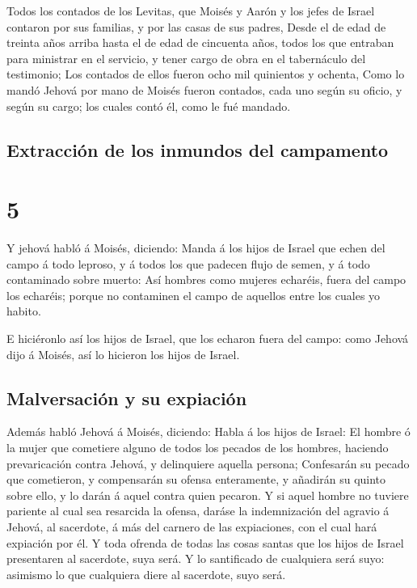  Todos los contados de los Levitas, que Moisés y Aarón y
los jefes de Israel contaron por sus familias, y por las casas de sus
padres,  Desde el de edad de treinta años arriba hasta el
de edad de cincuenta años, todos los que entraban para ministrar en el
servicio, y tener cargo de obra en el tabernáculo del testimonio;
 Los contados de ellos fueron ocho mil quinientos y
ochenta,  Como lo mandó Jehová por mano de Moisés fueron
contados, cada uno según su oficio, y según su cargo; los cuales contó
él, como le fué mandado.

\hypertarget{extracciuxf3n-de-los-inmundos-del-campamento}{%
\subsection{Extracción de los inmundos del
campamento}\label{extracciuxf3n-de-los-inmundos-del-campamento}}

\hypertarget{section-4}{%
\section{5}\label{section-4}}

 Y jehová habló á Moisés, diciendo:  Manda á los
hijos de Israel que echen del campo á todo leproso, y á todos los que
padecen flujo de semen, y á todo contaminado sobre muerto: 
Así hombres como mujeres echaréis, fuera del campo los echaréis; porque
no contaminen el campo de aquellos entre los cuales yo habito.

 E hiciéronlo así los hijos de Israel, que los echaron fuera
del campo: como Jehová dijo á Moisés, así lo hicieron los hijos de
Israel.

\hypertarget{malversaciuxf3n-y-su-expiaciuxf3n}{%
\subsection{Malversación y su
expiación}\label{malversaciuxf3n-y-su-expiaciuxf3n}}

 Además habló Jehová á Moisés, diciendo:  Habla
á los hijos de Israel: El hombre ó la mujer que cometiere alguno de
todos los pecados de los hombres, haciendo prevaricación contra Jehová,
y delinquiere aquella persona;  Confesarán su pecado que
cometieron, y compensarán su ofensa enteramente, y añadirán su quinto
sobre ello, y lo darán á aquel contra quien pecaron.  Y si
aquel hombre no tuviere pariente al cual sea resarcida la ofensa, daráse
la indemnización del agravio á Jehová, al sacerdote, á más del carnero
de las expiaciones, con el cual hará expiación por él.  Y
toda ofrenda de todas las cosas santas que los hijos de Israel
presentaren al sacerdote, suya será.  Y lo santificado de
cualquiera será suyo: asimismo lo que cualquiera diere al sacerdote,
suyo será.

